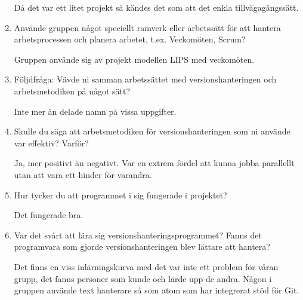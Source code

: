 \begin{enumerate}
  Då det var ett litet projekt så kändes det som att det enkla tillvägagångssätt.

  \item Använde gruppen något speciellt ramverk eller arbetssätt för att hantera arbetsprocessen och planera arbetet, t.ex. Veckomöten, Scrum?

  Gruppen använde sig av projekt modellen LIPS med veckomöten.

  \item Följdfråga: Vävde ni samman arbetssättet med versionshanteringen och arbetsmetodiken på något sätt?

  Inte mer än delade namn på vissa uppgifter.

  \item Skulle du säga att arbetsmetodiken för versionshanteringen som ni använde var effektiv? Varför?

  Ja, mer positivt än negativt. Var en extrem fördel att kunna jobba parallellt utan att vara ett hinder för varandra.

  \item Hur tycker du att programmet i sig fungerade i projektet?

  Det fungerade bra.

  \item Var det svårt att lära sig versionshanteringsprogrammet? Fanns det programvara som gjorde versionshanteringen blev lättare att hantera?

  Det finns en viss inlärningskurva med det var inte ett problem för våran grupp, det fanns personer som kunde och lärde upp de andra. Någon i gruppen använde text hanterare så som atom som har integrerat stöd för Git.

\end{enumerate}
